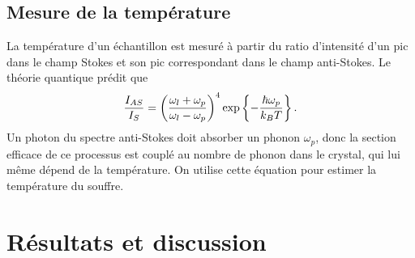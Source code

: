 \documentclass[10pt,letterpaper,twocolumn]{article}
\DeclarePairedDelimiter\autobracket{(}{)}
\newcommand{\br}[1]{\autobracket*{#1}}
\begin{document}
\subsection{Mesure de la température}
La température d'un échantillon est mesuré à partir du ratio d'intensité d'un pic dans le champ Stokes et son pic correspondant dans le champ anti-Stokes. Le théorie quantique prédit que
\begin{equation}\label{eq:temperature}
	\frac{I_{AS}}{I_S} = \br{\frac{\omega_l + \omega_p}{\omega_l - \omega_p}}^4 \exp\left\{-\frac{\hbar \omega_p}{k_BT}   \right\}.
\end{equation}
Un photon du spectre anti-Stokes doit absorber un phonon $\omega_p$, donc la section efficace de ce processus est couplé au nombre de phonon dans le crystal, qui lui même dépend de la température. On utilise cette équation pour estimer la température du souffre. 

\section{Résultats et discussion}\label{sec:resultats} %
\end{document}

